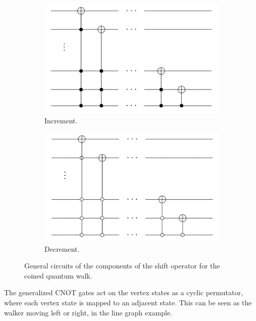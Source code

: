 \documentclass[../../dissertation.tex]{subfiles}
\begin{document}
\begin{figure}[!h]
  \centering
  \begin{subfigure}[t]{.4\textwidth}
    \centering
    \includegraphics[width=\linewidth]{img/QCircuit/CoinedQuantumWalk/DouglasWangIncrement.png}
    \caption{Increment.}
  \end{subfigure}
  \begin{subfigure}[t]{.4\textwidth}
    \centering
    \includegraphics[width=\linewidth]{img/QCircuit/CoinedQuantumWalk/DouglasWangDecrement.png}
    \caption{Decrement.}
  \end{subfigure}
  \caption{General circuits of the components of the shift operator for the coined quantum walk.}
  \label{fig:douglasWangShift}
\end{figure}
The generalized CNOT gates act on the vertex states as a cyclic permutator, where
each vertex state is mapped to an adjacent state. This can be seen as the walker moving
left or right, in the line graph example.
\end{document}
